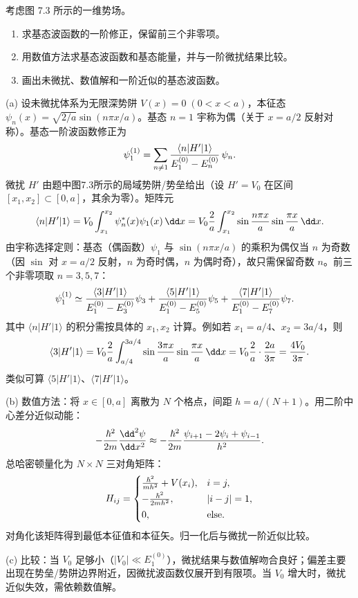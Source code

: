 \begin{question}
考虑图 7.3 所示的一维势场。
\begin{enumerate}
\item 求基态波函数的一阶修正，保留前三个非零项。
\item 用数值方法求基态波函数和基态能量，并与一阶微扰结果比较。
\item 画出未微扰、数值解和一阶近似的基态波函数。
\end{enumerate}
\end{question}
\begin{solution}
(a) 设未微扰体系为无限深势阱 $V(x)=0\;(0<x<a)$，本征态 $\psi_n(x)=\sqrt{2/a}\sin(n\pi x/a)$。基态 $n=1$ 宇称为偶（关于 $x=a/2$ 反射对称）。基态一阶波函数修正为
\[
\psi_1^{(1)}=\sum_{n\ne1}{\langle n|H'|1\rangle\over E_1^{(0)}-E_n^{(0)}}\,\psi_n.
\]
微扰 $H'$ 由题中图7.3所示的局域势阱/势垒给出（设 $H'=V_0$ 在区间 $[x_1,x_2]\subset[0,a]$，其余为零）。矩阵元
\[
\langle n|H'|1\rangle=V_0\int_{x_1}^{x_2}\psi_n^*(x)\psi_1(x)\,\dd x
=V_0{2\over a}\int_{x_1}^{x_2}\sin{n\pi x\over a}\sin{\pi x\over a}\,\dd x.
\]
由宇称选择定则：基态（偶函数）$\psi_1$ 与 $\sin(n\pi x/a)$ 的乘积为偶仅当 $n$ 为奇数（因 $\sin$ 对 $x=a/2$ 反射，$n$ 为奇时偶，$n$ 为偶时奇），故只需保留奇数 $n$。前三个非零项取 $n=3,5,7$：
\[
\begin{aligned}
\psi_1^{(1)}&\simeq
{\langle3|H'|1\rangle\over E_1^{(0)}-E_3^{(0)}}\psi_3
+{\langle5|H'|1\rangle\over E_1^{(0)}-E_5^{(0)}}\psi_5
+{\langle7|H'|1\rangle\over E_1^{(0)}-E_7^{(0)}}\psi_7.
\end{aligned}
\]
其中 $\langle n|H'|1\rangle$ 的积分需按具体的 $x_1,x_2$ 计算。例如若 $x_1=a/4$、$x_2=3a/4$，则
\[
\langle3|H'|1\rangle=V_0{2\over a}\int_{a/4}^{3a/4}\sin{3\pi x\over a}\sin{\pi x\over a}\,\dd x
=V_0{2\over a}\cdot{2a\over3\pi}={4V_0\over3\pi}.
\]
类似可算 $\langle5|H'|1\rangle$、$\langle7|H'|1\rangle$。

(b) 数值方法：将 $x\in[0,a]$ 离散为 $N$ 个格点，间距 $h=a/(N+1)$。用二阶中心差分近似动能：
\[
-{\hbar^2\over2m}{\dd^2\psi\over\dd x^2}
\approx -{\hbar^2\over2m}{\psi_{i+1}-2\psi_i+\psi_{i-1}\over h^2}.
\]
总哈密顿量化为 $N\times N$ 三对角矩阵：
\[
H_{ij}=
\begin{cases}
{\hbar^2\over m h^2}+V(x_i), & i=j,\\[2pt]
-{\hbar^2\over2m h^2}, & |i-j|=1,\\[2pt]
0, & \text{else}.
\end{cases}
\]
对角化该矩阵得到最低本征值和本征矢。归一化后与微扰一阶近似比较。

(c) 比较：当 $V_0$ 足够小（$|V_0|\ll E_1^{(0)}$），微扰结果与数值解吻合良好；偏差主要出现在势垒/势阱边界附近，因微扰波函数仅展开到有限项。当 $V_0$ 增大时，微扰近似失效，需依赖数值解。
\end{solution}

